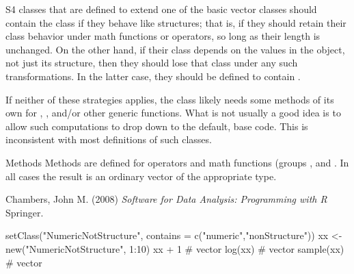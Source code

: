 %
\begin{Description}\relax
 S4 classes that are defined to extend one of the basic
vector classes should contain the class
 if they behave like structures; that
is, if they should retain their class behavior under math functions
or operators, so long as their length is unchanged.
On the other hand, if their class depends on the values in the
object, not just its structure, then they should lose that class
under any such transformations.  In the latter case, they should be
defined to contain .

If neither of these strategies applies, the class likely needs some
methods of its own for , , and/or
other generic functions. What is not usually a good idea is to allow
such computations to drop down to the default, base code.  This is
inconsistent with most definitions of such classes.
\end{Description}
%
\begin{Section}{Methods}
Methods are defined for operators and math functions (groups
,  and  .  In
all cases the result is an ordinary vector of the appropriate type.
\end{Section}
%
\begin{References}\relax
Chambers, John M. (2008)
\emph{Software for Data Analysis: Programming with R}
Springer.
\end{References}
%
\begin{SeeAlso}\relax
{}
\end{SeeAlso}
%
\begin{Examples}
\begin{ExampleCode}
setClass("NumericNotStructure", contains = c("numeric","nonStructure"))
xx <- new("NumericNotStructure", 1:10)
xx + 1 # vector
log(xx) # vector
sample(xx) # vector

\end{ExampleCode}
\end{Examples}
